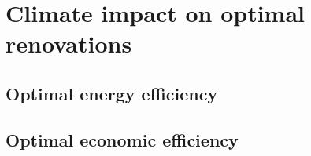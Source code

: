 \documentclass[11pt]{article}
\begin{document}
        

\clearpage
\section{Climate impact on optimal renovations}
\label{sec:opti}

    \subsection{Optimal energy efficiency} %
    \label{sub:optimal_energy_efficiency}
    

    \subsection{Optimal economic efficiency} %
    \label{sub:optimal_economic_efficiency}
    

    
    


\end{document}
